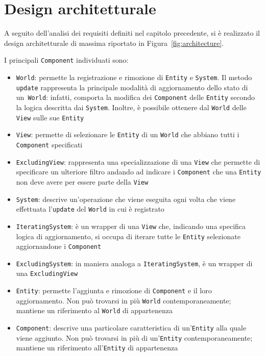 \chapter{Design architetturale}\label{ch:design-architetturale}
A seguito dell'analisi dei requisiti definiti nel capitolo precedente, si è realizzato il design architetturale
di massima riportato in Figura~\ref{fig:architecture}.

I principali \texttt{Component} individuati sono:
\begin{itemize}
    \item \texttt{World}: permette la registrazione e rimozione di \texttt{Entity} e \texttt{System}.
    Il metodo \texttt{update} rappresenta la principale modalità di aggiornamento dello stato di un~\texttt{World}:
    infatti, comporta la modifica dei \texttt{Component} delle \texttt{Entity} secondo la logica descritta dai
    \texttt{System}.
    Inoltre, è possibile ottenere dal \texttt{World} delle \texttt{View} sulle sue \texttt{Entity}
    \item \texttt{View}: permette di selezionare le \texttt{Entity} di un \texttt{World} che abbiano tutti i
    \texttt{Component} specificati
    \item \texttt{ExcludingView}: rappresenta una specializzazione di una \texttt{View} che permette di specificare un
    ulteriore filtro andando ad indicare i \texttt{Component} che una \texttt{Entity} non deve avere per essere parte
    della \texttt{View}
    \item \texttt{System}: descrive un'operazione che viene eseguita ogni volta che viene effettuata l'\texttt{update}
    del \texttt{World} in cui è registrato
    \item \texttt{IteratingSystem}: è un wrapper di una \texttt{View} che, indicando una specifica logica di
    aggiornamento, si occupa di iterare tutte le \texttt{Entity} selezionate aggiornandone i \texttt{Component}
    \item \texttt{ExcludingSystem}: in maniera analoga a \texttt{IteratingSystem}, è un wrapper di una
    \texttt{ExcludingView}
    \item \texttt{Entity}: permette l'aggiunta e rimozione di \texttt{Component} e il loro aggiornamento.
    Non può trovarsi in più \texttt{World} contemporaneamente;
    mantiene un riferimento al \texttt{World} di appartenenza
    \item \texttt{Component}: descrive una particolare caratteristica di un'\texttt{Entity} alla quale viene aggiunto.
    Non può trovarsi in più di un'\texttt{Entity} contemporaneamente;
    mantiene un riferimento all'\texttt{Entity} di appartenenza
\end{itemize}

